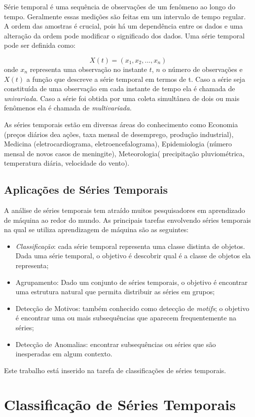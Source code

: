 Série temporal é uma sequência de observações de um fenômeno ao longo do tempo. Geralmente essas medições são feitas em um intervalo de tempo regular. A ordem das amostras é crucial, pois há um dependência entre os dados e uma alteração da ordem pode modificar o significado dos dados. Uma série temporal pode ser definida como:

\begin{equation} \label{eq_TS}
X(t) = (x_1,x_2,...,x_n)
\end{equation}
onde $x_n$ representa uma observação no instante $t$, $n$ o número de observações e $X(t)$ a função que descreve a série temporal em termos de t. Caso a série seja constituída de uma observação em cada instante de tempo ela é chamada de \textit{univariada}. Caso a série foi obtida por uma coleta simultânea de dois ou mais fenômenos ela é chamada de \textit{multivariada}.

As séries temporais estão em diversas áreas do conhecimento como Economia (preços diários dea ações, taxa mensal de desemprego, produção industrial), Medicina (eletrocardiograma, eletroencefalograma), Epidemiologia (número mensal de novos casos de meningite), Meteorologia( precipitação pluviométrica, temperatura diária, velocidade do vento).

\subsection{Aplicações de Séries Temporais}
A análise de séries temporais tem atraído muitos pesquisadores em aprendizado de máquina ao redor do mundo. As principais tarefas envolvendo séries temporais na qual se utiliza aprendizagem de máquina são as seguintes:

\begin{itemize}
	\item \textit{Classificação}: cada série temporal representa uma classe distinta de objetos. Dada uma série temporal, o objetivo é descobrir qual é a classe de objetos ela representa; 
	\item Agrupamento: Dado um conjunto de séries temporais, o objetivo é encontrar uma estrutura natural que permita distribuir as séries em grupos; 
	\item Detecção de Motivos: também conhecido como detecção de \textit{motifs}; o objetivo é encontrar uma ou mais subsequências que aparecem frequentemente na séries;
	\item Detecção de Anomalias: encontrar subsequências ou séries que são inesperadas em algum contexto.
\end{itemize}
Este trabalho está inserido na tarefa de classificações de séries temporais.
\section{Classificação de Séries Temporais}



